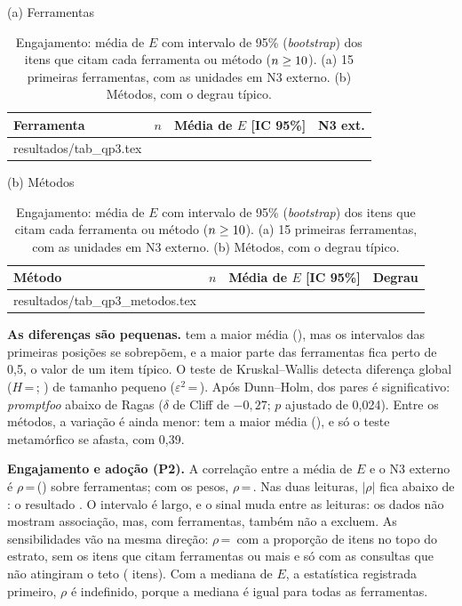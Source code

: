 \documentclass[sigconf]{acmart}
\makeatletter
\newcommand{\val}[2]{#1\,=\,#2}
\newcommand{\pval}[1]{\expandafter\msr@pval#1\@nil}
\def\msr@pval#1#2\@nil{$p$\ifx#1\ensuremath\,\else\,=\,\fi#1#2}
\newcommand{\linhas}[1]{\@@input resultados/#1.tex }
\makeatother
\begin{document}
\begin{table}[htbp]
\centering
\caption{Engajamento: média de $E$ com intervalo de 95\% (\textit{bootstrap}) dos itens que citam cada ferramenta ou método ($n \geq 10$). (a) 15 primeiras ferramentas, com as unidades em N3 externo. (b) Métodos, com o degrau típico.}
\label{tab:qp3}
\footnotesize
\setlength{\tabcolsep}{3.5pt}
{(a) Ferramentas}\\[2pt]
\begin{tabular}{@{}lrcr@{}}
\toprule
\textbf{Ferramenta} & \textbf{$n$} & \textbf{Média de $E$ [IC 95\%]} & \textbf{N3 ext.} \\
\midrule
\linhas{tab_qp3}
\bottomrule
\end{tabular}

\vspace{6pt}
{(b) Métodos}\\[2pt]
\begin{tabular}{@{}lrcl@{}}
\toprule
\textbf{Método} & \textbf{$n$} & \textbf{Média de $E$ [IC 95\%]} & \textbf{Degrau} \\
\midrule
\linhas{tab_qp3_metodos}
\bottomrule
\end{tabular}
\end{table}

\textbf{As diferenças são pequenas.} \ResEngTopFerramenta{} tem a maior média (\ResEngTopFerramentaMed), mas os intervalos das primeiras posições se sobrepõem, e a maior parte das ferramentas fica perto de 0,5, o valor de um item típico. O teste de Kruskal--Wallis detecta diferença global (\val{$H$}{\ResKwH}; \pval{\ResKwP}) de tamanho pequeno (\val{$\varepsilon^2$}{\ResKwEps}). Após Dunn--Holm, \ResDunnSig{} dos \ResDunnPares{} pares é significativo: %
\textit{promptfoo} abaixo de Ragas ($\delta$ de Cliff de $-0{,}27$; $p$ ajustado de 0,024). %
Entre os métodos, a variação é ainda menor: \ResEngTopMetodo{} tem a maior média (\ResEngTopMetodoMed), e só o teste metamórfico se afasta, com 0,39.

\textbf{Engajamento e adoção (P2).} A correlação entre a média de $E$ e o N3 externo é \val{$\rho$}{\ResRho} [\ResRhoLo; \ResRhoHi] (\pval{\ResRhoP}) sobre \ResRhoN{} ferramentas; com os pesos, \val{$\rho$}{\ResRhoPond}. Nas duas leituras, $|\rho|$ fica abaixo de \ResLimiarRho: o resultado \ResPDoisConclusao. O intervalo é largo, e o sinal muda entre as leituras: os dados não mostram associação, mas, com \ResRhoN{} ferramentas, também não a excluem. As sensibilidades vão na mesma direção: \val{$\rho$}{\ResRhoTopo} com a proporção de itens no topo do estrato, \ResRhoSemListicle{} sem os itens que citam \ResListicle{} ferramentas ou mais e \ResRhoNaoTruncadas{} só com as consultas que não atingiram o teto (\ResItensNaoTruncadas{} itens). Com a mediana de $E$, a estatística registrada primeiro, $\rho$ é indefinido, porque a mediana é igual para todas as ferramentas.
\end{document}
